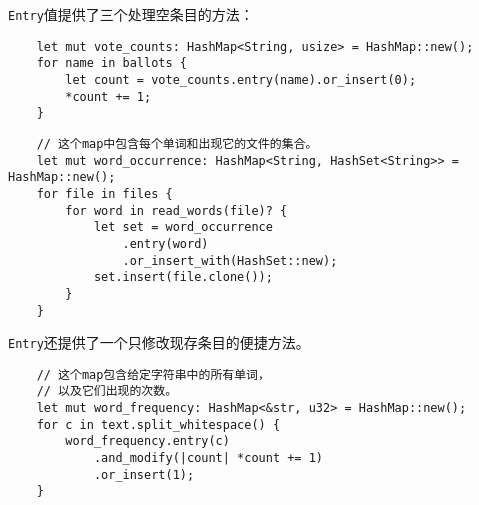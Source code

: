 \texttt{Entry}值提供了三个处理空条目的方法：


\begin{verbatim}
    let mut vote_counts: HashMap<String, usize> = HashMap::new();
    for name in ballots {
        let count = vote_counts.entry(name).or_insert(0);
        *count += 1;
    }
\end{verbatim}



\begin{verbatim}
    // 这个map中包含每个单词和出现它的文件的集合。
    let mut word_occurrence: HashMap<String, HashSet<String>> = HashMap::new();
    for file in files {
        for word in read_words(file)? {
            let set = word_occurrence
                .entry(word)
                .or_insert_with(HashSet::new);
            set.insert(file.clone());
        }
    }
\end{verbatim}

\texttt{Entry}还提供了一个只修改现存条目的便捷方法。


\begin{verbatim}
    // 这个map包含给定字符串中的所有单词，
    // 以及它们出现的次数。
    let mut word_frequency: HashMap<&str, u32> = HashMap::new();
    for c in text.split_whitespace() {
        word_frequency.entry(c)
            .and_modify(|count| *count += 1)
            .or_insert(1);
    }
\end{verbatim}

